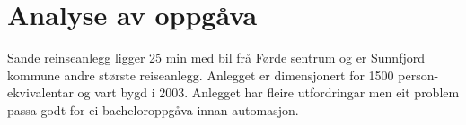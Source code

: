 \chapter{Analyse av oppgåva}
\thispagestyle{fancy}
Sande reinseanlegg ligger 25 min med bil frå Førde sentrum og er Sunnfjord kommune 
andre største reiseanlegg. Anlegget er dimensjonert for 1500 person-ekvivalentar
og vart bygd i 2003. Anlegget har fleire utfordringar men eit problem passa godt for ei
bacheloroppgåva innan automasjon.